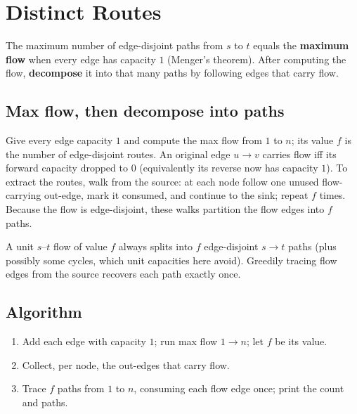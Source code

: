 \section{Distinct Routes}
\label{sec:cses-distinct-routes}


\begin{patternbox}
The maximum number of edge-disjoint paths from $s$ to $t$ equals the
\textbf{maximum flow} when every edge has capacity $1$ (Menger's theorem).
After computing the flow, \textbf{decompose} it into that many paths by
following edges that carry flow.
\end{patternbox}

\subsection*{Max flow, then decompose into paths}

Give every edge capacity $1$ and compute the max flow from $1$ to $n$; its
value $f$ is the number of edge-disjoint routes. An original edge $u\to v$
carries flow iff its forward capacity dropped to $0$ (equivalently its
reverse now has capacity $1$). To extract the routes, walk from the source:
at each node follow one unused flow-carrying out-edge, mark it consumed, and
continue to the sink; repeat $f$ times. Because the flow is edge-disjoint,
these walks partition the flow edges into $f$ paths.

\begin{ideabox}
A unit $s$--$t$ flow of value $f$ always splits into $f$ edge-disjoint
$s\to t$ paths (plus possibly some cycles, which unit capacities here avoid).
Greedily tracing flow edges from the source recovers each path exactly once.
\end{ideabox}

\subsection*{Algorithm}

\begin{enumerate}
  \item Add each edge with capacity $1$; run max flow $1\to n$; let $f$ be
        its value.
  \item Collect, per node, the out-edges that carry flow.
  \item Trace $f$ paths from $1$ to $n$, consuming each flow edge once; print
        the count and paths.
\end{enumerate}

